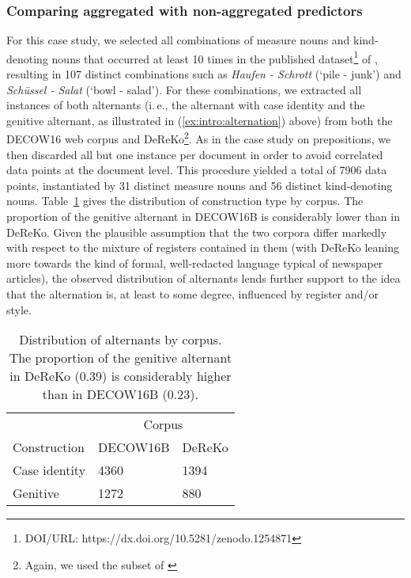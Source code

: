 \subsubsection{Comparing aggregated with non-aggregated predictors}

For this case study, we selected all combinations of measure nouns and kind-denoting nouns that occurred at least 10 times in the published dataset\footnote{DOI/URL: https://dx.doi.org/10.5281/zenodo.1254871} of \cite{Schaefer2018}, resulting in 107 distinct combinations such as \textit{Haufen - Schrott} (`pile - junk') and \textit{Schüssel - Salat} (`bowl - salad').
 For these combinations, we extracted all instances of both alternants (i.\,e., the alternant with case identity and the genitive alternant, as illustrated in (\ref{ex:intro:alternation}) above) from both the DECOW16 web corpus and DeReKo\footnote{Again, we used the subset of \cite{Bubenhofer-ea2014}}.
 As in the case study on prepositions, we then discarded all but one instance per document in order to avoid correlated data points at the document level.
 This procedure yielded a total of 7906 data points, instantiated by 31 distinct measure nouns and 56 distinct kind-denoting nouns. Table~\ref{mn-dataset-summary} gives the distribution of construction type by corpus.
 The proportion of the genitive alternant in DECOW16B is considerably lower than in DeReKo.
 Given the plausible assumption that the two corpora differ markedly with respect to the mixture of registers contained in them (with DeReKo leaning more towards the kind of formal, well-redacted language typical of newspaper articles), the observed distribution of alternants lends further support to the idea that the alternation is, at least to some degree, influenced by register and/or style.


\begin{table}
  \begin{tabular}{lll}
  \toprule
                 & \multicolumn{2}{c}{Corpus}\\
  Construction   & DECOW16B & DeReKo\\
  \midrule
  Case identity  &  4360    & 1394 \\
  Genitive       &  1272    & 880 \\
  \bottomrule
  \end{tabular}
  \caption{Distribution of alternants by corpus. The proportion of the genitive alternant in DeReKo (0.39) is considerably higher than in DECOW16B (0.23).}\label{mn-dataset-summary}  
\end{table}


